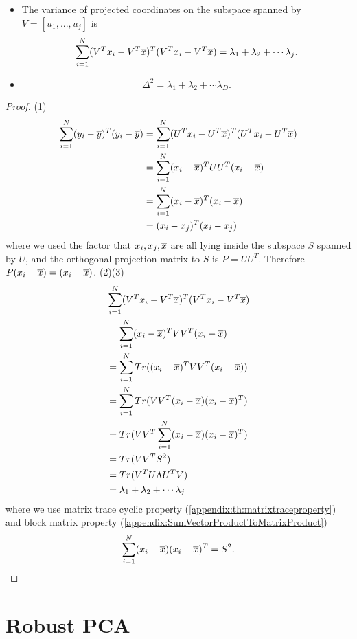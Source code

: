\begin{refsection}
\begin{lemma}
\begin{itemize}
	\item The variance of projected coordinates on the subspace spanned by $V=[u_1,...,u_j]$ is
	$$\sum_{i=1}^N (V^Tx_i - V^T\overline{x})^T(V^Tx_i - V^T\overline{x}) = \lambda_1+\lambda_2+ \cdots \lambda_j.$$
	\item $$\Delta^2 = \lambda_1+\lambda_2+ \cdots \lambda_D.$$
\end{itemize}
\end{lemma}
\begin{proof}
(1)	
\begin{align*}
\sum_{i=1}^N (y_i - \overline{y})^T(y_i - \overline{y}) &= \sum_{i=1}^N (U^Tx_i - U^T\overline{x})^T(U^Tx_i - U^T\overline{x}) \\
&= \sum_{i=1}^N (x_i - \overline{x})^TUU^T(x_i - \overline{x})\\
&=  \sum_{i=1}^N (x_i - \overline{x})^T(x_i - \overline{x})\\
&= (x_i-x_j)^T(x_i-x_j)
\end{align*}	
where we used the factor that $x_i, x_j, \overline{x}$ are all lying inside the subspace $S$ spanned by $U$, and the orthogonal projection matrix to $S$ is $P=UU^T$. Therefore $P(x_i-\overline{x}) = (x_i-\overline{x})$.
(2)(3)
\begin{align*}
 & \sum_{i=1}^N (V^Tx_i - V^T\overline{x})^T(V^Tx_i - V^T\overline{x}) \\
&= \sum_{i=1}^N (x_i - \overline{x})^TVV^T(x_i - \overline{x})\\
&= \sum_{i=1}^N Tr((x_i - \overline{x})^TVV^T(x_i - \overline{x}))\\
&= \sum_{i=1}^N Tr(VV^T(x_i - \overline{x})(x_i - \overline{x})^T)\\
&=  Tr(VV^T\sum_{i=1}^N(x_i - \overline{x})(x_i - \overline{x})^T)\\
&= Tr(VV^T S^2) \\
&= Tr(V^TU\Lambda U^TV) \\
&= \lambda_1+\lambda_2+ \cdots \lambda_j
\end{align*} 	
where we use matrix trace cyclic property (\autoref{appendix:th:matrixtraceproperty}) and block matrix property (\autoref{appendix:SumVectorProductToMatrixProduct})
$$\sum_{i=1}^N(x_i - \overline{x})(x_i - \overline{x})^T = S^2.$$
\end{proof}







\section{Robust PCA}

\end{refsection}
